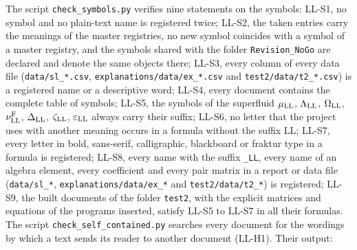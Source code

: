 \documentclass[
  10pt,
]{article}
\begin{document}
The script \texttt{check\_symbols.py} verifies nine statements on the
symbols: LL-S1, no symbol and no plain-text name is registered twice;
LL-S2, the taken entries carry the meanings of the master registries, no
new symbol coincides with a symbol of a master registry, and the symbols
shared with the folder \texttt{Revision\_NoGo} are declared and denote
the same objects there; LL-S3, every column of every data file
(\texttt{data/sl\_*.csv}, \texttt{explanations/data/ex\_*.csv} and
\texttt{test2/data/t2\_*.csv}) is a registered name or a descriptive
word; LL-S4, every document contains the complete table of symbols;
LL-S5, the symbols of the superfluid \(\mu_{\rm LL}\),
\(\Lambda_{\rm LL}\), \(\Omega_{\rm LL}\), \(\nu^{\rm F}_{\rm LL}\),
\(\Delta_{\rm LL}\), \(\zeta_{\rm LL}\), \(\varepsilon_{\rm LL}\) always
carry their suffix; LL-S6, no letter that the project uses with another
meaning occurs in a formula without the suffix LL; LL-S7, every letter
in bold, sans-serif, calligraphic, blackboard or fraktur type in a
formula is registered; LL-S8, every name with the suffix \texttt{\_LL},
every name of an algebra element, every coefficient and every pair
matrix in a report or data file (\texttt{data/sl\_*},
\texttt{explanations/data/ex\_*} and \texttt{test2/data/t2\_*}) is
registered; LL-S9, the built documents of the folder \texttt{test2},
with the explicit matrices and equations of the programs inserted,
satisfy LL-S5 to LL-S7 in all their formulas. The script
\texttt{check\_self\_contained.py} searches every document for the
wordings by which a text sends its reader to another document (LL-H1).
Their output:
\end{document}
